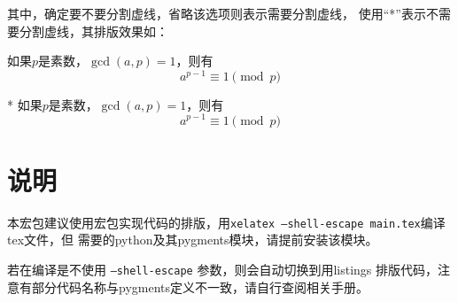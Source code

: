 \documentclass{ctexart}
\newcommand{\qtmark}[1]{“#1”}
\begin{document}
其中，确定要不要分割虚线，省略该选项则表示需要分割虚线，
使用\qtmark{*}表示不需要分割虚线，其排版效果如：

\begin{texdemov}
  如果$p$是素数，$\gcd(a,p)=1$，则有
$$a^{p-1} \equiv 1 \pmod{p}$$
\end{texdemov}

\begin{texdemov}*
如果$p$是素数，$\gcd(a,p)=1$，则有
$$a^{p-1} \equiv 1 \pmod{p}$$
\end{texdemov}

\section{说明}
本宏包建议使用宏包实现代码的排版，用\texttt{xelatex
  --shell-escape main.tex}编译tex文件，但 
需要的python及其pygments模块，请提前安装该模块。

若在编译是不使用 \texttt{--shell-escape} 参数，则会自动切换到用listings
排版代码，注意有部分代码名称与pygments定义不一致，请自行查阅相关手册。
\end{document}
